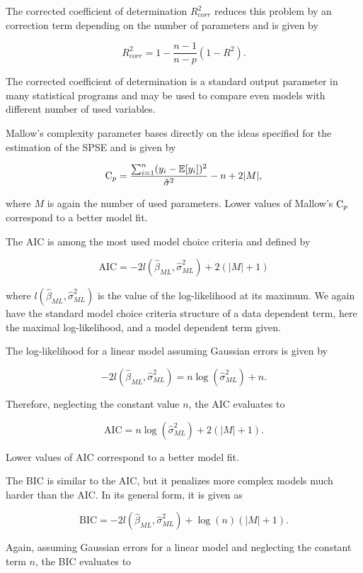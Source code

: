The corrected coefficient of determination $R_{corr}^2$ reduces this problem by an correction term depending on the  number of parameters and is given by

$$R_{corr}^2 = 1 - \frac{n-1}{n-p}(1-R^2). $$

The corrected coefficient of determination is a standard output parameter in many statistical programs and may be used to compare even models with different number of used variables. 


Mallow's complexity parameter bases directly on the ideas specified for the estimation of the SPSE and is given by

$$\text C_p = \frac{\sum_{i=1}^n (y_i - \mathbb{E}[y_i])^2}{\hat \sigma^2} - n + 2 \vert M \vert,$$

where $M$ is again the number of used parameters. Lower values of Mallow's $\text C_p$ correspond to a better model fit.


The AIC is among the most used model choice criteria and defined by

$$\text{AIC} = -2 l(\hat \beta_{ML}, \hat \sigma^2_{ML}) + 2(\vert M \vert +1)$$

where $l(\hat \beta_{ML}, \hat \sigma^2_{ML})$ is the value of the log-likelihood at its maximum. We again have the standard model choice criteria structure of a data dependent term, here the maximal log-likelihood, and a model dependent term given. 

The log-likelihood for a linear model assuming Gaussian errors is given by

$$-2l(\hat\beta_{ML}, \hat \sigma_{ML}^2) = n \log(\hat \sigma_{ML}^2) + n.$$

Therefore, neglecting the constant value $n$, the AIC evaluates to

$$\text{AIC} = n \log(\hat \sigma^2_{ML}) + 2(\vert M \vert + 1).$$

Lower values of AIC correspond to a better model fit. 


The BIC is similar to the AIC, but it penalizes more complex models much harder than the AIC. In its general form, it is given as 

$$\text{BIC} = -2l(\hat\beta_{ML}, \hat \sigma^2_{ML}) + \log(n) (\vert M \vert + 1).$$

Again, assuming Gaussian errors for a linear model and neglecting the constant term $n$, the BIC evaluates to

